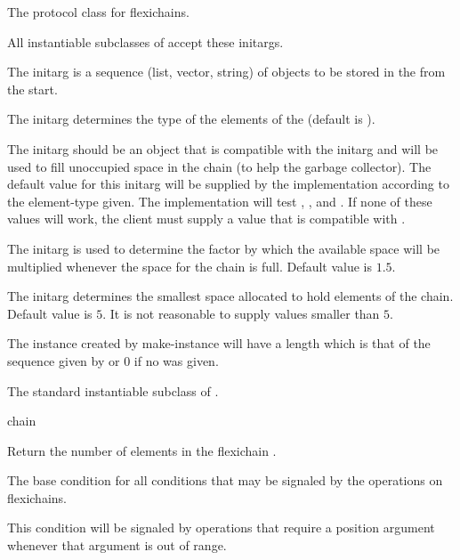 \documentclass[11pt]{article}
\begin{document}
The protocol class for flexichains. 


All instantiable subclasses of  accept these
initargs. 

The  initarg is a sequence (list, vector,
string) of objects to be stored in the  from the start.

The  initarg determines the type of the elements of
the  (default is ). 

The  initarg should be an object that is compatible
with the  initarg and will be used to fill
unoccupied space in the chain (to help the garbage
collector).  The default value for this initarg will be supplied by
the implementation according to the element-type given.  The
implementation will test , , and .
If none of these values will work, the client must supply a value that
is compatible with .

The  initarg is used to determine the factor by
which the available space will be multiplied whenever the space for
the chain is full.  Default value is $1.5$.

The  initarg determines the smallest space allocated to
hold elements of the chain.  Default value is $5$.  It is not
reasonable to supply values smaller than $5$. 

The instance created by make-instance will have a length which is that
of the sequence given by  or $0$ if no
 was given.


The standard instantiable subclass of .

 {chain}

Return the number of elements in the flexichain . 


The base condition for all conditions that may be signaled by the
operations on flexichains.


This condition will be signaled by operations that require a position
argument whenever that argument is out of range. 
\end{document}
